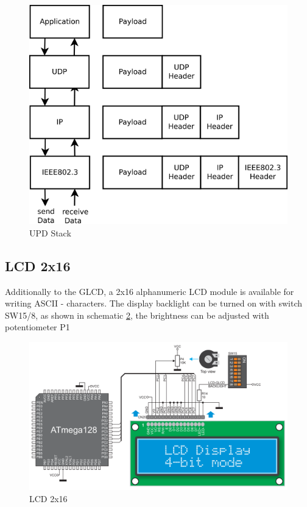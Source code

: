 \begin{figure}[h]
 \centerline{\includegraphics[width=.8\columnwidth]{pics/udpstack.png}}
  \caption{UPD Stack}
  \label{fig:udpstack}
\end{figure}


\newpage

\subsection{LCD 2x16}

Additionally to the GLCD, a 2x16 alphanumeric LCD module is available for writing ASCII - characters. The display backlight can be turned on with switch SW15/8, as shown in schematic \ref{fig:lcd2x16}, the brightness can be adjusted with potentiometer P1

\begin{figure}[h]
 \centerline{\includegraphics[width=1.0\columnwidth]{pics/lcd2x16.png}}
  \caption{LCD 2x16}
  \label{fig:lcd2x16}
\end{figure}


